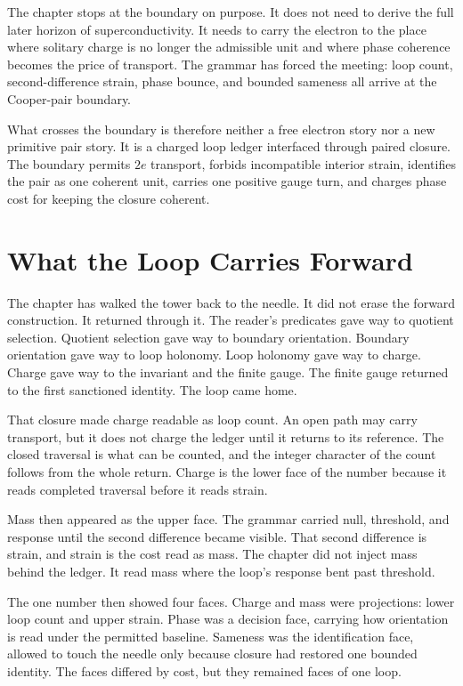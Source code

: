 The chapter stops at the boundary on purpose. It does not need to derive the
full later horizon of superconductivity. It needs to carry the electron to
the place where solitary charge is no longer the admissible unit and where
phase coherence becomes the price of transport. The grammar has forced the
meeting: loop count, second-difference strain, phase bounce, and bounded
sameness all arrive at the Cooper-pair boundary.

What crosses the boundary is therefore neither a free electron story nor a
new primitive pair story. It is a charged loop ledger interfaced through
paired closure. The boundary permits \(2e\) transport, forbids incompatible
interior strain, identifies the pair as one coherent unit, carries one
positive gauge turn, and charges phase cost for keeping the closure coherent.

\section{What the Loop Carries Forward}

The chapter has walked the tower back to the needle. It did not erase the
forward construction. It returned through it. The reader's predicates gave
way to quotient selection. Quotient selection gave way to boundary
orientation. Boundary orientation gave way to loop holonomy. Loop holonomy
gave way to charge. Charge gave way to the invariant and the finite gauge.
The finite gauge returned to the first sanctioned identity. The loop came
home.

That closure made charge readable as loop count. An open path may carry
transport, but it does not charge the ledger until it returns to its
reference. The closed traversal is what can be counted, and the integer
character of the count follows from the whole return. Charge is the lower
face of the number because it reads completed traversal before it reads
strain.

Mass then appeared as the upper face. The grammar carried null, threshold,
and response until the second difference became visible. That second
difference is strain, and strain is the cost read as mass. The chapter did
not inject mass behind the ledger. It read mass where the loop's response
bent past threshold.

The one number then showed four faces. Charge and mass were projections:
lower loop count and upper strain. Phase was a decision face, carrying how
orientation is read under the permitted baseline. Sameness was the
identification face, allowed to touch the needle only because closure had
restored one bounded identity. The faces differed by cost, but they remained
faces of one loop.

